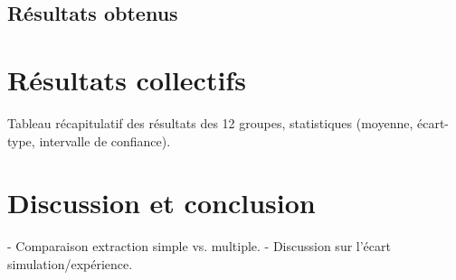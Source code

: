 \documentclass[12pt,a4paper]{article}
\begin{document}
\subsection{Résultats obtenus}

	\section{Résultats collectifs}
	Tableau récapitulatif des résultats des 12 groupes, statistiques (moyenne, écart-type, intervalle de confiance).
	
	\section{Discussion et conclusion}
	- Comparaison extraction simple vs. multiple.  
	- Discussion sur l’écart simulation/expérience.  
	
\end{document}
